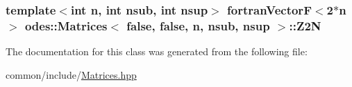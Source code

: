 \hypertarget{classodes_1_1Matrices_3_01false_00_01false_00_01n_00_01nsub_00_01nsup_01_4_a1e70bb1cfd110fc9ae14f8ecd66cbc85}{
\subsubsection[{Z2\-N}]{\setlength{\rightskip}{0pt plus 5cm}template$<$int n, int nsub, int nsup$>$ {\bf fortran\-Vector\-F}$<$2$\ast$n$>$ {\bf odes\-::\-Matrices}$<$ false, false, n, nsub, nsup $>$\-::Z2\-N\hspace{0.3cm}{\ttfamily [private]}}}\label{classodes_1_1Matrices_3_01false_00_01false_00_01n_00_01nsub_00_01nsup_01_4_a1e70bb1cfd110fc9ae14f8ecd66cbc85}


The documentation for this class was generated from the following file\-:\begin{DoxyCompactItemize}
\item 
common/include/\hyperlink{Matrices_8hpp}{Matrices.\-hpp}\end{DoxyCompactItemize}
